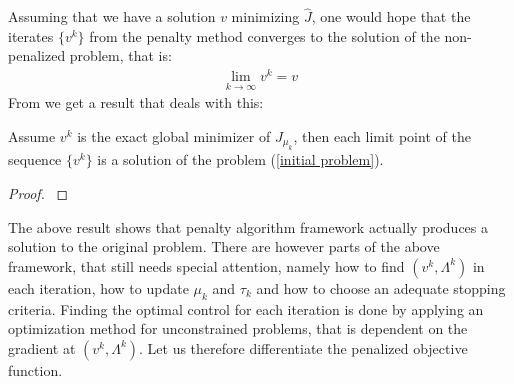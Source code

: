 Assuming that we have a solution $v$ minimizing $\hat J$, one would hope that the iterates $\{v^k\}$ from the penalty method converges to the solution of the non-penalized problem, that is:
\begin{align*}
\lim_{k\rightarrow \infty} v^k =v
\end{align*}
From \cite{nocedal2006numerical} we get a result that deals with this:
\begin{theorem}
Assume $v^k$ is the exact global minimizer of $J_{\mu_k}$, then each limit point of the sequence $\{v^k\}$ is a solution of the problem (\ref{initial problem}).
\end{theorem}
\begin{proof}
\cite{nocedal2006numerical}
\end{proof}
The above result shows that penalty algorithm framework actually produces a solution to the original problem. There are however parts of the above framework, that still needs special attention, namely how to find $(v^k,\Lambda^k)$ in each iteration, how to update $\mu_k$ and $\tau_k$ and how to choose an adequate stopping criteria. Finding the optimal control for each iteration is done by applying an optimization method for unconstrained problems, that is dependent on the gradient at $(v^k,\Lambda^k)$. Let us therefore differentiate the penalized objective function.
